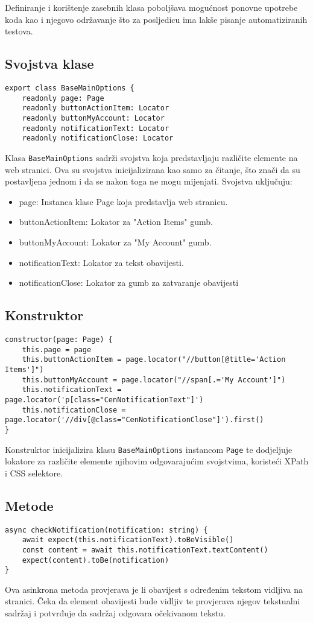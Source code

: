 Definiranje i korištenje zasebnih klasa poboljšava mogućnost ponovne upotrebe koda kao i njegovo održavanje što za posljedicu ima lakše pisanje automatiziranih testova.

\subsection{Svojstva klase}
\begin{verbatim}
export class BaseMainOptions {
    readonly page: Page
    readonly buttonActionItem: Locator
    readonly buttonMyAccount: Locator
    readonly notificationText: Locator
    readonly notificationClose: Locator
\end{verbatim}
Klasa \texttt{BaseMainOptions} sadrži svojstva koja predstavljaju različite elemente na web stranici. Ova su svojstva inicijalizirana kao samo za čitanje, što znači da su postavljena jednom i da se nakon toga ne mogu mijenjati. Svojstva uključuju:
\begin{itemize}
    \item page: Instanca klase Page koja predstavlja web stranicu.
    \item buttonActionItem: Lokator za "Action Items" gumb.
    \item buttonMyAccount: Lokator za "My Account" gumb.
    \item notificationText: Lokator za tekst obavijesti.
    \item notificationClose: Lokator za gumb za zatvaranje obavijesti
\end{itemize}

\subsection{Konstruktor}
\begin{verbatim}
constructor(page: Page) {
    this.page = page
    this.buttonActionItem = page.locator("//button[@title='Action Items']")
    this.buttonMyAccount = page.locator("//span[.='My Account']")
    this.notificationText = page.locator('p[class="CenNotificationText"]')
    this.notificationClose = page.locator('//div[@class="CenNotificationClose"]').first()
}
\end{verbatim}
Konstruktor inicijalizira klasu \texttt{BaseMainOptions} instancom \texttt{Page} te dodjeljuje lokatore za različite elemente njihovim odgovarajućim svojstvima, koristeći XPath i CSS selektore.

\subsection{Metode}
\begin{verbatim}
async checkNotification(notification: string) {
    await expect(this.notificationText).toBeVisible()
    const content = await this.notificationText.textContent()
    expect(content).toBe(notification)
}
\end{verbatim}
Ova asinkrona metoda provjerava je li obavijest s određenim tekstom vidljiva na stranici. Čeka da element obavijesti bude vidljiv te provjerava njegov tekstualni sadržaj i potvrđuje da sadržaj odgovara očekivanom tekstu.

